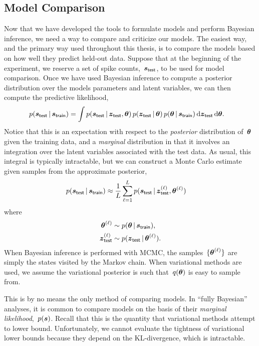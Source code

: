 \subsection{Model Comparison}
Now that we have developed the tools to formulate models and perform
Bayesian inference, we need a way to compare and criticize our models.
The easiest way, and the primary way used throughout this thesis, is
to compare the models based on how well they predict 
held-out data. Suppose that at the beginning of the experiment, we reserve
a set of spike counts,~$\boldsymbol{s}_{\mathsf{test}}$, to be used for model
comparison. Once we have used Bayesian inference to compute a
posterior distribution over the models parameters and latent variables,
we can then compute the predictive likelihood,
\begin{align}
  \label{eq:predictive_likelihood}
  p(\boldsymbol{s}_{\mathsf{test}} \,|\, \boldsymbol{s}_{\mathsf{train}})
  &= \int p(\boldsymbol{s}_{\mathsf{test}} \,|\, \boldsymbol{z}_{\mathsf{test}}, \boldsymbol{\theta}) \,
  p(\boldsymbol{z}_{\mathsf{test}} \,|\, \boldsymbol{\theta}) \,
  p(\boldsymbol{\theta} \,|\, \boldsymbol{s}_{\mathsf{train}}) \,
  \mathrm{d}\boldsymbol{z}_{\mathsf{test}} \, \mathrm{d} \boldsymbol{\theta}.
\end{align}
Notice that this is an expectation with respect to the \emph{posterior}
distribution of~$\boldsymbol{\theta}$ given the training data, and a \emph{marginal}
distribution in that it involves an integration over the latent variables
associated with the test data. As usual, this integral is typically
intractable, but we can construct a Monte Carlo estimate given 
samples from the approximate posterior,
\begin{align*}
  p(\boldsymbol{s}_{\mathsf{test}} \,|\, \boldsymbol{s}_{\mathsf{train}})
  &\approx \frac{1}{L} \sum_{\ell=1}^L
  p(\boldsymbol{s}_{\mathsf{test}} \,|\, \boldsymbol{z}_{\mathsf{test}}^{(\ell)}, \boldsymbol{\theta}^{(\ell)}) \,
\end{align*}
where
\begin{align*}
  \boldsymbol{\theta}^{(\ell)} &\sim p(\boldsymbol{\theta} \,|\, \boldsymbol{s}_{\mathsf{train}}), \\
  \boldsymbol{z}_{\mathsf{test}}^{(\ell)} &\sim   p(\boldsymbol{z}_{\mathsf{test}} \,|\, \boldsymbol{\theta}^{(\ell)}).
\end{align*}
When Bayesian inference is performed with MCMC, the samples~$\{\boldsymbol{\theta}^{(\ell)}\}$
are simply the states visited by the Markov chain. When variational methods
are used, we assume the variational posterior is such that~$q(\boldsymbol{\theta})$ is
easy to sample from.

This is by no means the only method of comparing models. In ``fully
Bayesian'' analyses, it is common to compare models on the basis of
their \emph{marginal likelihood},~$p(\boldsymbol{s})$. Recall that this is the
quantity that variational methods attempt to lower bound. Unfortunately,
we cannot evaluate the tightness of variational lower bounds because
they depend on the KL-divergence, which is intractable.


